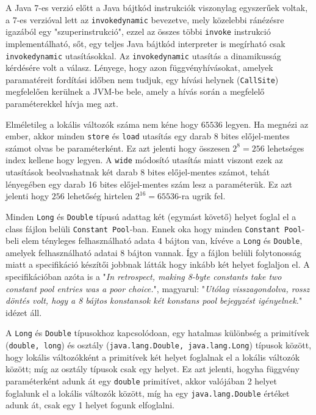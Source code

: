 \begin{compactitem}
 \item A Java 7-es verzió előtt a Java bájtkód instrukciók viszonylag egyszerűek voltak, a 7-es verzióval lett az \lstinline{invokedynamic} bevezetve, mely közelebbi ránézésre igazából egy "szuperinstrukció", ezzel az összes többi \lstinline{invoke} instrukció implementálható, sőt, egy teljes Java bájtkód interpreter is megírható csak \lstinline{invokedynamic} utasításokkal. Az \lstinline{invokedynamic} utasítás a dinamikusság kérdésére volt a válasz. Lényege, hogy azon függvényhívásokat, amelyek paramatéreit fordítási időben nem tudjuk, egy hívási helynek (\lstinline{CallSite}) megfelelően kerülnek a JVM-be bele, amely a hívás során a megfelelő paraméterekkel hívja meg azt.
 \item Elméletileg a lokális változók száma nem kéne hogy $65536$ legyen. Ha megnézi az ember, akkor minden \lstinline{store} és \lstinline{load} utasítás egy darab 8 bites előjel-mentes számot olvas be paraméterként. Ez azt jelenti hogy összesen $2^{8} = 256$ lehetséges index kellene hogy legyen. A \lstinline{wide} módosító utasítás miatt viszont ezek az utasítások beolvashatnak két darab 8 bites előjel-mentes számot, tehát lényegében egy darab 16 bites előjel-mentes szám lesz a paraméterük. Ez azt jelenti hogy $256$ lehetőség hirtelen $2^{16} = 65536$-ra ugrik fel.
 \item Minden \lstinline{Long} és \lstinline{Double} típusú adattag két (egymást követő) helyet foglal el a class fájlon belüli \lstinline{Constant Pool}-ban. Ennek oka hogy minden \lstinline{Constant Pool}-beli elem tényleges felhasználható adata $4$ bájton van, kívéve a \lstinline{Long} és \lstinline{Double}, amelyek felhasználható adatai $8$ bájton vannak. Így a fájlon belüli folytonosság miatt a specifikáció készítői jobbnak látták hogy inkább két helyet foglaljon el. A specifikációban azóta is a "\textit{In retrospect, making 8-byte constants take two constant pool entries was a poor choice.}", magyarul: "\textit{Utólag visszagondolva, rossz döntés volt, hogy a 8 bájtos konstansok két konstans pool bejegyzést igényelnek.}" idézet áll.
 \item A \lstinline{Long} és \lstinline{Double} típusokhoz kapcsolódoan, egy hatalmas különbség a primitívek (\lstinline{double, long}) és osztály (\lstinline{java.lang.Double, java.lang.Long}) típusok között, hogy lokális változókként a primitívek két helyet foglalnak el a lokális változók között; míg az osztály típusok csak egy helyet. Ez azt jelenti, hogyha függvény paraméterként adunk át egy \lstinline{double} primitívet, akkor valójában 2 helyet foglalunk el a lokális változók között, míg ha egy \lstinline{java.lang.Double} értéket adunk át, csak egy 1 helyet fogunk elfoglalni.

\end{compactitem}
